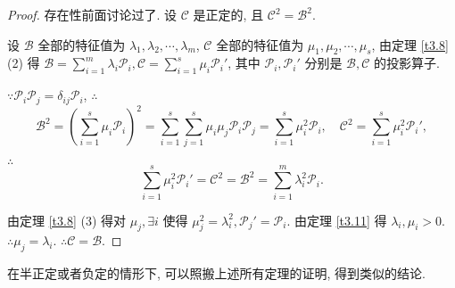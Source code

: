 \documentclass[color=black,device=normal,lang=cn,mode=geye]{elegantnote}
\begin{document}
\begin{proof}
    存在性前面讨论过了. 设 $\mathcal{C}$ 是正定的, 且 $\mathcal{C}^2=\mathcal{B}^2$.

    设 $\mathcal{B}$ 全部的特征值为 $\lambda_1,\lambda_2,\cdots,\lambda_m$, $\mathcal{C}$ 全部的特征值为 $\mu_1,\mu_2,\cdots,\mu_s$, 由定理 \ref{t3.8} (2) 得 $\mathcal{B}=\sum\limits_{i=1}^m\lambda_i\mathcal{P}_i,\mathcal{C}=\sum\limits_{i=1}^s\mu_i\mathcal{P}_i'$, 其中 $\mathcal{P}_i,\mathcal{P}_i'$ 分别是 $\mathcal{B},\mathcal{C}$ 的投影算子.

    $\because\mathcal{P}_i\mathcal{P}_j=\delta_{ij}\mathcal{P}_i$, $\therefore$
    \[\mathcal{B}^2=\left(\sum\limits_{i=1}^s\mu_i\mathcal{P}_i\right)^2=\sum\limits_{i=1}^s\sum\limits_{j=1}^s\mu_i\mu_j\mathcal{P}_i\mathcal{P}_j=\sum\limits_{i=1}^s\mu_i^2\mathcal{P}_i,\quad\mathcal{C}^2=\sum\limits_{i=1}^s\mu_i^2\mathcal{P}_i',\]

    $\therefore$
    \[\sum\limits_{i=1}^s\mu_i^2\mathcal{P}_i'=\mathcal{C}^2=\mathcal{B}^2=\sum\limits_{i=1}^m\lambda_i^2\mathcal{P}_i.\]

    由定理 \ref{t3.8} (3) 得对 $\mu_j,\exists i$ 使得 $\mu_j^2=\lambda_i^2,\mathcal{P}_j'=\mathcal{P}_i$. 由定理 \ref{t3.11} 得 $\lambda_i,\mu_i>0$. $\therefore\mu_j=\lambda_i$. $\therefore\mathcal{C}=\mathcal{B}$.
\end{proof}
在半正定或者负定的情形下, 可以照搬上述所有定理的证明, 得到类似的结论.
\end{document}
